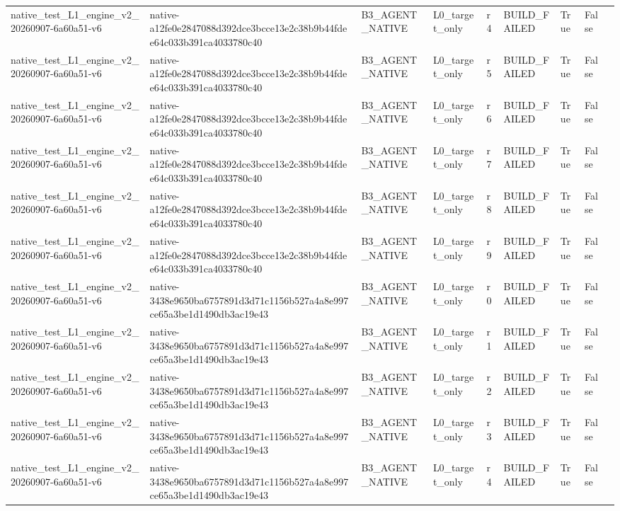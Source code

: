 \begin{tabular}{lllllllll}
native\_test\_L1\_engine\_v2\_20260907-6a60a51-v6 & native-a12fe0e2847088d392dce3bcce13e2c38b9b44fdee64c033b391ca4033780c40 & B3\_AGENT\_NATIVE & L0\_target\_only & r4 & BUILD\_FAILED & True & False &  \\
native\_test\_L1\_engine\_v2\_20260907-6a60a51-v6 & native-a12fe0e2847088d392dce3bcce13e2c38b9b44fdee64c033b391ca4033780c40 & B3\_AGENT\_NATIVE & L0\_target\_only & r5 & BUILD\_FAILED & True & False &  \\
native\_test\_L1\_engine\_v2\_20260907-6a60a51-v6 & native-a12fe0e2847088d392dce3bcce13e2c38b9b44fdee64c033b391ca4033780c40 & B3\_AGENT\_NATIVE & L0\_target\_only & r6 & BUILD\_FAILED & True & False &  \\
native\_test\_L1\_engine\_v2\_20260907-6a60a51-v6 & native-a12fe0e2847088d392dce3bcce13e2c38b9b44fdee64c033b391ca4033780c40 & B3\_AGENT\_NATIVE & L0\_target\_only & r7 & BUILD\_FAILED & True & False &  \\
native\_test\_L1\_engine\_v2\_20260907-6a60a51-v6 & native-a12fe0e2847088d392dce3bcce13e2c38b9b44fdee64c033b391ca4033780c40 & B3\_AGENT\_NATIVE & L0\_target\_only & r8 & BUILD\_FAILED & True & False &  \\
native\_test\_L1\_engine\_v2\_20260907-6a60a51-v6 & native-a12fe0e2847088d392dce3bcce13e2c38b9b44fdee64c033b391ca4033780c40 & B3\_AGENT\_NATIVE & L0\_target\_only & r9 & BUILD\_FAILED & True & False &  \\
native\_test\_L1\_engine\_v2\_20260907-6a60a51-v6 & native-3438e9650ba6757891d3d71c1156b527a4a8e997ce65a3be1d1490db3ac19e43 & B3\_AGENT\_NATIVE & L0\_target\_only & r0 & BUILD\_FAILED & True & False &  \\
native\_test\_L1\_engine\_v2\_20260907-6a60a51-v6 & native-3438e9650ba6757891d3d71c1156b527a4a8e997ce65a3be1d1490db3ac19e43 & B3\_AGENT\_NATIVE & L0\_target\_only & r1 & BUILD\_FAILED & True & False &  \\
native\_test\_L1\_engine\_v2\_20260907-6a60a51-v6 & native-3438e9650ba6757891d3d71c1156b527a4a8e997ce65a3be1d1490db3ac19e43 & B3\_AGENT\_NATIVE & L0\_target\_only & r2 & BUILD\_FAILED & True & False &  \\
native\_test\_L1\_engine\_v2\_20260907-6a60a51-v6 & native-3438e9650ba6757891d3d71c1156b527a4a8e997ce65a3be1d1490db3ac19e43 & B3\_AGENT\_NATIVE & L0\_target\_only & r3 & BUILD\_FAILED & True & False &  \\
native\_test\_L1\_engine\_v2\_20260907-6a60a51-v6 & native-3438e9650ba6757891d3d71c1156b527a4a8e997ce65a3be1d1490db3ac19e43 & B3\_AGENT\_NATIVE & L0\_target\_only & r4 & BUILD\_FAILED & True & False &  \\

\end{tabular}
